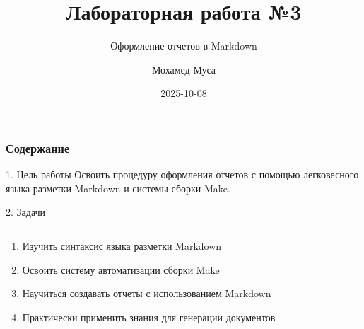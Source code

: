 \documentclass[
  ignorenonframetext,
  aspectratio=169,
]{beamer}
\title{Лабораторная работа №3}
\subtitle{Оформление отчетов в Markdown}
\author{Мохамед Муса}
\date{2025-10-08}
\providecommand{\tightlist}{%
  \setlength{\itemsep}{0pt}\setlength{\parskip}{0pt}}\usepackage{longtable,booktabs,array}
\renewcommand*\contentsname{Содержание}
\newcommand\contentsname{Содержание}
\begin{document}
\frame{\titlepage}

\renewcommand*\contentsname{Содержание}
\begin{frame}[allowframebreaks]
  \frametitle{Содержание}
  \tableofcontents[hideallsubsections]
\end{frame}
\begin{frame}{1. Цель работы}
\label{ux446ux435ux43bux44c-ux440ux430ux431ux43eux442ux44b}
Освоить процедуру оформления отчетов с помощью легковесного языка
разметки Markdown и системы сборки Make.
\end{frame}

\begin{frame}{2. Задачи}
\label{ux437ux430ux434ux430ux447ux438}
\begin{columns}[c]
\begin{column}{0.6\textwidth}
\begin{enumerate}[<+->]
\tightlist
\item
  Изучить синтаксис языка разметки Markdown
\item
  Освоить систему автоматизации сборки Make
\item
  Научиться создавать отчеты с использованием Markdown
\item
  Практически применить знания для генерации документов
\end{enumerate}
\end{column}

\begin{column}{0.4\textwidth}
\end{column}
\end{columns}
\end{frame}
\end{document}
